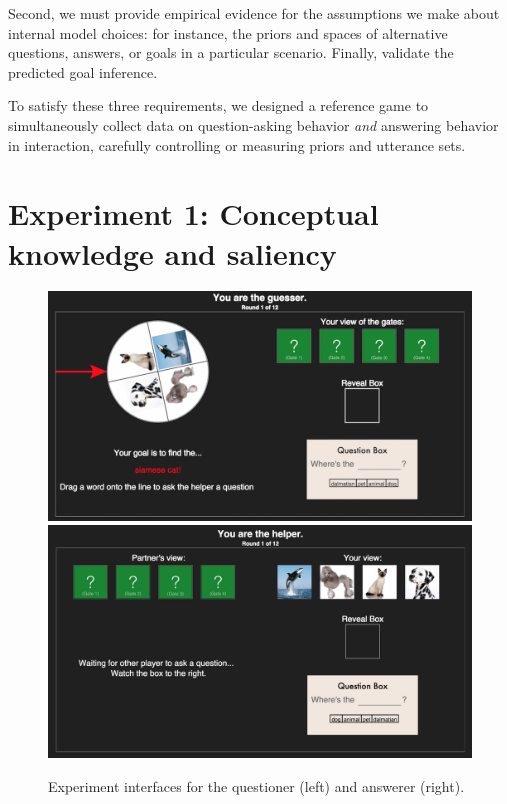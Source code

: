\documentclass[12pt, floatsintext, jou]{apa6}
\begin{document}
Second, we must provide empirical evidence for the assumptions we make about internal model choices: for instance, the priors and spaces of alternative questions, answers, or goals in a particular scenario. 
Finally, validate the predicted goal inference. 

To satisfy these three requirements, we designed a reference game to simultaneously collect data on question-asking behavior \emph{and} answering behavior in interaction, carefully controlling or measuring priors and utterance sets. 

\section{Experiment 1: Conceptual knowledge and saliency}

\begin{figure}[t!]
\begin{center}
\includegraphics[scale = .213]{Exp1/GuesserViewStart}
\includegraphics[scale = .105]{Exp1/HelperViewStart}
\end{center}
\caption{Experiment interfaces for the questioner (left) and answerer (right).}
\label{fig:expviews}
\end{figure}
\end{document}
